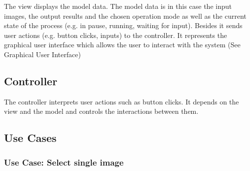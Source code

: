 \documentclass[parskip=full]{scrartcl}
\begin{document}
The view displays the model data. The model data is in this case the input images,  the output results and the chosen operation mode as well as the current state of the process (e.g. in pause, running, waiting for input). Besides it sends user actions (e.g. button clicks, inputs) to the controller. It represents the graphical user interface which allows the user to interact with the system (See Graphical User Interface)

\subsection{Controller}

The controller interprets user actions such as button clicks. It depends on the view and the model and controls the interactions between them.

\pagebreak





\subsection{Use Cases}


\subsubsection {Use Case: Select single image} \label {uc:sip}
\end{document}

